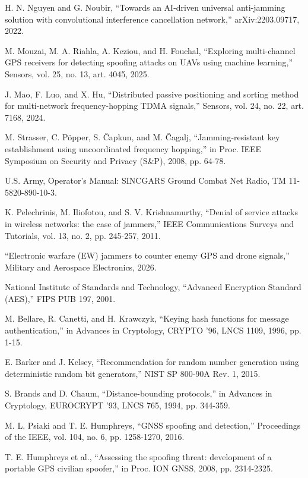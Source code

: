  H. N. Nguyen and G. Noubir, ``Towards an AI-driven universal anti-jamming solution with convolutional interference cancellation network,'' arXiv:2203.09717, 2022.

 M. Mouzai, M. A. Riahla, A. Keziou, and H. Fouchal, ``Exploring multi-channel GPS receivers for detecting spoofing attacks on UAVs using machine learning,'' Sensors, vol. 25, no. 13, art. 4045, 2025.

 J. Mao, F. Luo, and X. Hu, ``Distributed passive positioning and sorting method for multi-network frequency-hopping TDMA signals,'' Sensors, vol. 24, no. 22, art. 7168, 2024.

 M. Strasser, C. Pöpper, S. \v{C}apkun, and M. \v{C}agalj, ``Jamming-resistant key establishment using uncoordinated frequency hopping,'' in Proc. IEEE Symposium on Security and Privacy (S\&P), 2008, pp. 64-78.

 U.S. Army, Operator's Manual: SINCGARS Ground Combat Net Radio, TM 11-5820-890-10-3.

 K. Pelechrinis, M. Iliofotou, and S. V. Krishnamurthy, ``Denial of service attacks in wireless networks: the case of jammers,'' IEEE Communications Surveys and Tutorials, vol. 13, no. 2, pp. 245-257, 2011.

 ``Electronic warfare (EW) jammers to counter enemy GPS and drone signals,'' Military and Aerospace Electronics, 2026.

 National Institute of Standards and Technology, ``Advanced Encryption Standard (AES),'' FIPS PUB 197, 2001.

 M. Bellare, R. Canetti, and H. Krawczyk, ``Keying hash functions for message authentication,'' in Advances in Cryptology, CRYPTO '96, LNCS 1109, 1996, pp. 1-15.

 E. Barker and J. Kelsey, ``Recommendation for random number generation using deterministic random bit generators,'' NIST SP 800-90A Rev. 1, 2015.

 S. Brands and D. Chaum, ``Distance-bounding protocols,'' in Advances in Cryptology, EUROCRYPT '93, LNCS 765, 1994, pp. 344-359.

 M. L. Psiaki and T. E. Humphreys, ``GNSS spoofing and detection,'' Proceedings of the IEEE, vol. 104, no. 6, pp. 1258-1270, 2016.

 T. E. Humphreys et al., ``Assessing the spoofing threat: development of a portable GPS civilian spoofer,'' in Proc. ION GNSS, 2008, pp. 2314-2325.

